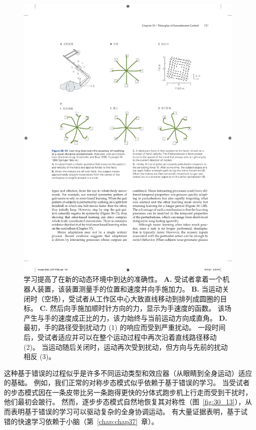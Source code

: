 \begin{figure}[htbp]
	\centering
	\includegraphics[width=0.95\linewidth]{chap30/fig_30_12}
	\caption{学习提高了在新的动态环境中到达的准确性\cite{brashers1996consolidation}。
		\textbf{A.} 受试者拿着一个机器人装置，该装置测量手的位置和速度并向手施加力。
		\textbf{B.} 当运动关闭时（空场），受试者从工作区中心大致直线移动到排列成圆圈的目标。
		\textbf{C.} 然后向手施加顺时针方向的力，显示为手速度的函数。
		该场产生与手的速度成正比的力，该力始终与当前运动方向成直角。
		\textbf{D.} 最初，手的路径受到扰动力 (1) 的响应而受到严重扰动。
		一段时间后，受试者适应并可以在整个运动过程中再次沿着直线路径移动 (2)。
		当运动随后关闭时，运动再次受到扰动，但方向与先前的扰动相反 (3)。}
	\label{fig:30_12}
\end{figure}


这种基于错误的过程似乎是许多不同运动类型和效应器（从眼睛到全身运动）适应的基础。
例如，我们正常的对称步态模式似乎依赖于基于错误的学习。
当受试者的步态模式因在一条皮带比另一条跑得更快的分体式跑步机上行走而受到干扰时，他们最初会跛行。
然而，逐步步态模式自然地恢复其对称性（图~\ref{fig:30_13}），从而表明基于错误的学习可以驱动复杂的全身协调运动。
有大量证据表明，基于试错的快速学习依赖于小脑（第~\ref{chap:chap37}~章）。


